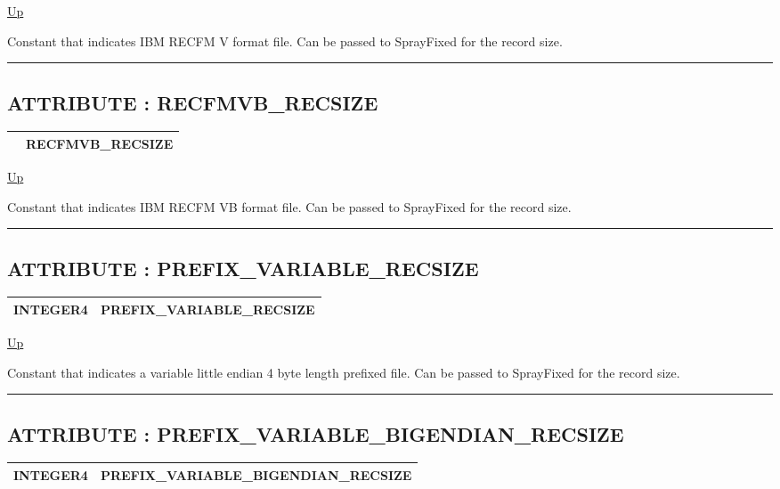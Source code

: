 \hyperlink{ecldoc:File}{Up}

\par
Constant that indicates IBM RECFM V format file. Can be passed to SprayFixed for the record size.


\rule{\textwidth}{0.4pt}
\subsection*{ATTRIBUTE : RECFMVB\_RECSIZE}
\hypertarget{ecldoc:file.recfmvb_recsize}{}

{\renewcommand{\arraystretch}{1.5}
\begin{tabularx}{\textwidth}{|>{\raggedright\arraybackslash}l|X|}
\hline
\hspace{0pt} & RECFMVB\_RECSIZE \\
\hline
\end{tabularx}
}

\hyperlink{ecldoc:File}{Up}

\par
Constant that indicates IBM RECFM VB format file. Can be passed to SprayFixed for the record size.


\rule{\textwidth}{0.4pt}
\subsection*{ATTRIBUTE : PREFIX\_VARIABLE\_RECSIZE}
\hypertarget{ecldoc:file.prefix_variable_recsize}{}

{\renewcommand{\arraystretch}{1.5}
\begin{tabularx}{\textwidth}{|>{\raggedright\arraybackslash}l|X|}
\hline
\hspace{0pt}INTEGER4 & PREFIX\_VARIABLE\_RECSIZE \\
\hline
\end{tabularx}
}

\hyperlink{ecldoc:File}{Up}

\par
Constant that indicates a variable little endian 4 byte length prefixed file. Can be passed to SprayFixed for the record size.


\rule{\textwidth}{0.4pt}
\subsection*{ATTRIBUTE : PREFIX\_VARIABLE\_BIGENDIAN\_RECSIZE}
\hypertarget{ecldoc:file.prefix_variable_bigendian_recsize}{}

{\renewcommand{\arraystretch}{1.5}
\begin{tabularx}{\textwidth}{|>{\raggedright\arraybackslash}l|X|}
\hline
\hspace{0pt}INTEGER4 & PREFIX\_VARIABLE\_BIGENDIAN\_RECSIZE \\
\hline
\end{tabularx}
}

